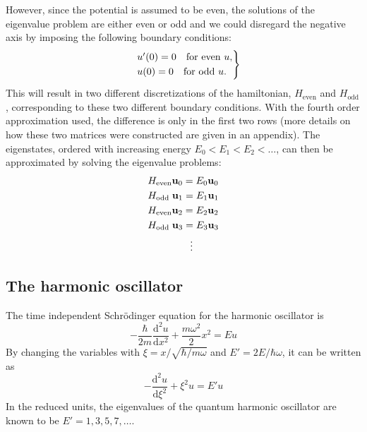 \documentclass[twocolumn]{article}
\begin{document}
\begin{large}
However, since the potential is assumed to be even, the solutions of the eigenvalue problem are either even or odd and we could disregard the negative axis by imposing the following boundary conditions:
\begin{equation}
    \begin{rcases}
        &u'(0) = 0 \quad \text{for even } u, \\ 
        &u(0) = 0  \quad \text{for odd } u.
    \end{rcases}
\end{equation} 
This will result in two different discretizations of the hamiltonian, $H_\text{even}$ and $H_\text{odd}$, corresponding to these two different boundary conditions. With the fourth order approximation used, the difference is only in the first two rows (more details on how these two matrices were constructed are given in an appendix). The eigenstates, ordered with increasing energy $E_0<E_1<E_2<\dots$, can then be approximated by solving the eigenvalue problems:
\begin{equation}
    \begin{split}
        &H_\text{even}\mathbf{u}_0 = E_0\mathbf{u}_0 \\ 
        &H_\text{odd } \mathbf{u}_1 = E_1\mathbf{u}_1 \\ 
        &H_\text{even}\mathbf{u}_2 = E_2\mathbf{u}_2 \\ 
        &H_\text{odd }\mathbf{u}_3 = E_3\mathbf{u}_3 \\ 
        &\hspace{1.5cm} \vdots
    \end{split}
\end{equation}


\subsection*{The harmonic oscillator}
The time independent Schrödinger equation for the harmonic oscillator is 
\begin{equation}
    -\frac{\hbar}{2m}\frac{\text{d}^2u}{\text{d}x^2} + \frac{m\omega^2}{2}x^2 = Eu
\end{equation}
By changing the variables with $\xi = x/\sqrt{\hbar/m\omega}$ and $E' = 2E/\hbar\omega$, it can be written as 
\begin{equation}
    \label{29mar1748}
    -\frac{\text{d}^2u}{\text{d}\xi^2} + \xi^2u = E'u
\end{equation}
In the reduced units, the eigenvalues of the quantum harmonic oscillator are known to be $E'=1,3,5,7,\dots$. 


\end{large}
\end{document}

